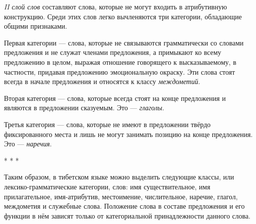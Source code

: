 \emph{II слой слов} составляют слова, которые не могут входить в атрибутивную конструкцию. Среди этих слов легко вычленяются три категории, обладающие общими признаками.

Первая категории --- слова, которые не связываются грамматически со словами предложения и не служат членами предложения, а примыкают ко всему предложению в целом, выражая отношение говорящего к высказываемому, в частности, придавая предложению эмоциональную окраску. Эти слова стоят всегда в начале предложения и относятся к классу \emph{междометий}.

Вторая категория --- слова, которые всегда стоят на конце предложения и являются в предложении сказуемым. Это --- \emph{глаголы}.

Третья категория --- слова, которые не имеют в предложении твёрдо фиксированного места и лишь не могут занимать позицию на конце предложения. Это --- \emph{наречия}.

\begin{center}
* * *
\end{center}

Таким образом, в тибетском языке можно выделить следующие классы, или лексико-грамматические категории, слов: имя существительное, имя прилагательное, имя-атрибутив, местоимение, числительное, наречие, глагол, междометия и служебные слова. Положение слова в составе предложения и его функции в нём зависят только от категориальной принадлежности данного слова.